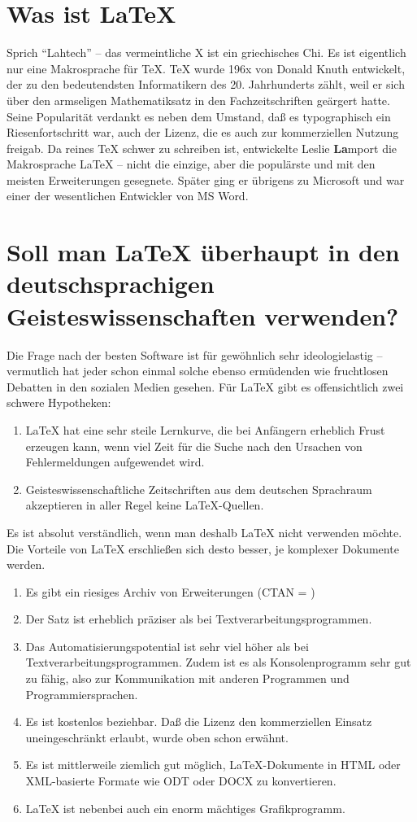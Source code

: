 \documentclass[12pt]{scrreprt}
\begin{document}
\section{Was ist \LaTeX}
Sprich \enquote{Lahtech} -- das vermeintliche X ist ein griechisches Chi. Es ist eigentlich nur eine Makrosprache für \TeX{}. \TeX{} wurde 196x von Donald Knuth entwickelt, der zu den bedeutendsten Informatikern des 20. Jahrhunderts zählt, weil er sich über den armseligen Mathematiksatz in den Fachzeitschriften geärgert hatte. Seine Popularität verdankt es neben dem Umstand, daß es typographisch ein Riesenfortschritt war, auch der Lizenz, die es auch zur kommerziellen Nutzung freigab. Da reines \TeX{} schwer zu schreiben ist, entwickelte Leslie \textbf{La}mport die Makrosprache \LaTeX{} -- nicht die einzige, aber die populärste und mit den meisten Erweiterungen gesegnete. Später ging er übrigens zu Microsoft und war einer der wesentlichen Entwickler von MS Word.
 
\section{Soll man \LaTeX{} überhaupt in den deutschsprachigen Geisteswissenschaften verwenden?}
Die Frage nach der besten Software ist für gewöhnlich sehr ideologielastig -- vermutlich hat jeder schon  einmal solche ebenso ermüdenden wie fruchtlosen Debatten in den sozialen Medien gesehen. Für \LaTeX{} gibt es offensichtlich zwei schwere Hypotheken:
\begin{enumerate}
\item \LaTeX{} hat eine sehr steile Lernkurve, die bei Anfängern erheblich Frust erzeugen kann, wenn viel Zeit für die Suche nach den Ursachen von Fehlermeldungen aufgewendet wird.
\item Geisteswissenschaftliche Zeitschriften aus dem deutschen Sprachraum akzeptieren in aller Regel keine \LaTeX-Quellen.
\end{enumerate}
Es ist absolut verständlich, wenn man deshalb \LaTeX{} nicht verwenden möchte. Die Vorteile von \LaTeX{} erschließen sich desto besser, je komplexer Dokumente werden.
\begin{enumerate}
\item Es gibt ein riesiges Archiv von Erweiterungen (CTAN = )
\item Der Satz ist erheblich präziser als bei Textverarbeitungsprogrammen.
\item Das Automatisierungspotential ist sehr viel höher als bei Textverarbeitungsprogrammen. Zudem ist es als Konsolenprogramm sehr gut zu  fähig, also zur Kommunikation mit anderen Programmen und Programmiersprachen.
\item Es ist kostenlos beziehbar. Daß die Lizenz den kommerziellen Einsatz uneingeschränkt erlaubt, wurde oben schon erwähnt.
\item Es ist mittlerweile ziemlich gut möglich, \LaTeX-Dokumente in HTML oder XML-basierte Formate wie ODT oder DOCX zu konvertieren.
\item \LaTeX{} ist nebenbei auch ein enorm mächtiges Grafikprogramm.
\end{enumerate}
\end{document}

